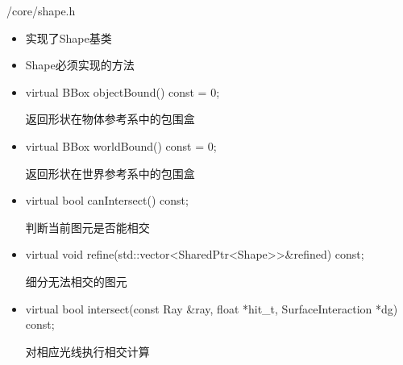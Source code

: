 \documentclass{beamer}
\begin{document}
\begin{frame} {/core/shape.h}
\begin{itemize} [<+->]
\item 实现了Shape基类
\item Shape必须实现的方法
\item
\begin{semiverbatim} \small virtual BBox objectBound() const = 0; \end{semiverbatim}
返回形状在物体参考系中的包围盒
\item
\begin{semiverbatim} \small virtual BBox worldBound() const = 0; \end{semiverbatim}
返回形状在世界参考系中的包围盒
\item
\begin{semiverbatim} \small virtual bool canIntersect() const; \end{semiverbatim}
判断当前图元是否能相交
\item
\begin{semiverbatim} \small virtual void refine(std::vector<SharedPtr<Shape>>\&refined) const; \end{semiverbatim}
细分无法相交的图元
\item
\begin{semiverbatim} \small virtual bool intersect(const Ray \&ray, float *hit\_t, SurfaceInteraction *dg) const; \end{semiverbatim}
对相应光线执行相交计算
\end{itemize}
\end{frame}
\end{document}
